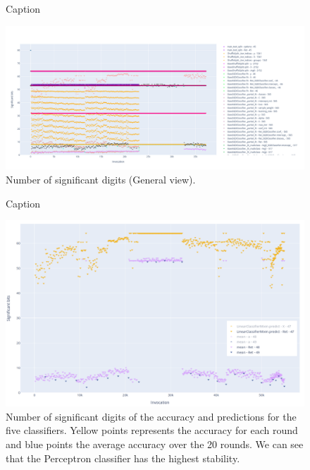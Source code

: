 \documentclass[11pt]{article}
\begin{document}
\begin{figure}
    \centering
    \caption{Caption}
    \includegraphics[width=\linewidth]{figure/classifier_comparisons/general.png}
    \caption{Number of significant digits (General view).}
    \label{fig:classifier_comparisons_general}
\end{figure}

\begin{figure}
    \centering
    \caption{Caption}
    \includegraphics[width=\linewidth]{figure/classifier_comparisons/mean_prediction_wo_legend.pdf}
    \caption{Number of significant digits of the accuracy and predictions for the five classifiers. 
    Yellow points represents the accuracy for each round and blue points the average accuracy 
    over the 20 rounds. We can see that the Perceptron classifier has the highest stability.}
    \label{fig:classifier_comparisons_mean_predictions}
\end{figure}

\end{document}
